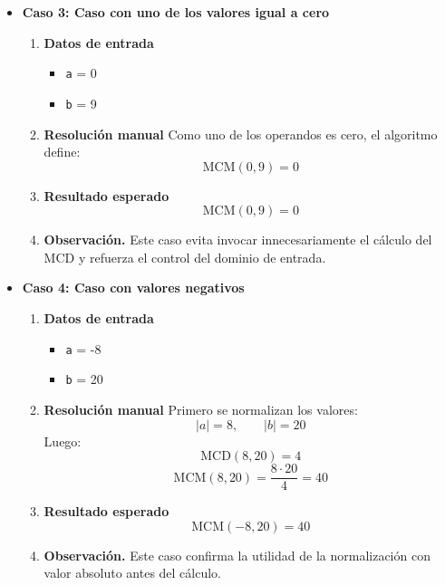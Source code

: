 \documentclass[12pt,twoside]{book}
\begin{document}
\begin{itemize}
							\item \textbf{Caso 3: Caso con uno de los valores igual a cero}
							\begin{enumerate}
								\item \textbf{Datos de entrada}
								\begin{itemize}
									\item \texttt{a} = 0
									\item \texttt{b} = 9
								\end{itemize}
								\item \textbf{Resolución manual}
								Como uno de los operandos es cero, el algoritmo define:
								\[
								\text{MCM}(0,9)=0
								\]
								\item \textbf{Resultado esperado}
								\[
								\text{MCM}(0,9)=0
								\]
								\item \textbf{Observación.} Este caso evita invocar innecesariamente el cálculo del MCD y refuerza el control del dominio de entrada.
							\end{enumerate}
							
							\item \textbf{Caso 4: Caso con valores negativos}
							\begin{enumerate}
								\item \textbf{Datos de entrada}
								\begin{itemize}
									\item \texttt{a} = -8
									\item \texttt{b} = 20
								\end{itemize}
								\item \textbf{Resolución manual}
								Primero se normalizan los valores:
								\[
								|a|=8,\qquad |b|=20
								\]
								Luego:
								\[
								\text{MCD}(8,20)=4
								\]
								\[
								\text{MCM}(8,20)=\frac{8\cdot 20}{4}=40
								\]
								\item \textbf{Resultado esperado}
								\[
								\text{MCM}(-8,20)=40
								\]
								\item \textbf{Observación.} Este caso confirma la utilidad de la normalización con valor absoluto antes del cálculo.
							\end{enumerate}
							

\end{itemize}
\end{document}
